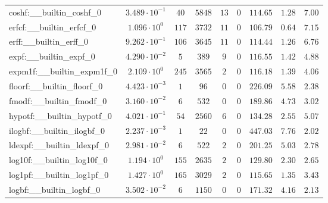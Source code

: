 \begin{tabular}{|l|c|c|c|c|c|c|c|c|}
coshf:\_\_builtin\_coshf\_0               & $ 3.489 \cdot 10^{-1} $ & $ 40     $ & $ 5848   $ & $ 13  $ & $ 0   $ & $ 114.65      $ & $ 1.28    $ & $ 7.00    $ \\
erfcf:\_\_builtin\_erfcf\_0               & $ 1.096 \cdot 10^{0}  $ & $ 117    $ & $ 3732   $ & $ 11  $ & $ 0   $ & $ 106.79      $ & $ 0.64    $ & $ 7.15    $ \\
erff:\_\_builtin\_erff\_0                 & $ 9.262 \cdot 10^{-1} $ & $ 106    $ & $ 3645   $ & $ 11  $ & $ 0   $ & $ 114.44      $ & $ 1.26    $ & $ 6.76    $ \\
expf:\_\_builtin\_expf\_0                 & $ 4.290 \cdot 10^{-2} $ & $ 5      $ & $ 389    $ & $ 9   $ & $ 0   $ & $ 116.55      $ & $ 1.42    $ & $ 4.88    $ \\
expm1f:\_\_builtin\_expm1f\_0             & $ 2.109 \cdot 10^{0}  $ & $ 245    $ & $ 3565   $ & $ 2   $ & $ 0   $ & $ 116.18      $ & $ 1.39    $ & $ 4.06    $ \\
floorf:\_\_builtin\_floorf\_0             & $ 4.423 \cdot 10^{-3} $ & $ 1      $ & $ 96     $ & $ 0   $ & $ 0   $ & $ 226.09      $ & $ 5.58    $ & $ 2.38    $ \\
fmodf:\_\_builtin\_fmodf\_0               & $ 3.160 \cdot 10^{-2} $ & $ 6      $ & $ 532    $ & $ 0   $ & $ 0   $ & $ 189.86      $ & $ 4.73    $ & $ 3.02    $ \\
hypotf:\_\_builtin\_hypotf\_0             & $ 4.021 \cdot 10^{-1} $ & $ 54     $ & $ 2560   $ & $ 6   $ & $ 0   $ & $ 134.28      $ & $ 2.55    $ & $ 5.07    $ \\
ilogbf:\_\_builtin\_ilogbf\_0             & $ 2.237 \cdot 10^{-3} $ & $ 1      $ & $ 22     $ & $ 0   $ & $ 0   $ & $ 447.03      $ & $ 7.76    $ & $ 2.02    $ \\
ldexpf:\_\_builtin\_ldexpf\_0             & $ 2.981 \cdot 10^{-2} $ & $ 6      $ & $ 522    $ & $ 2   $ & $ 0   $ & $ 201.25      $ & $ 5.03    $ & $ 2.78    $ \\
log10f:\_\_builtin\_log10f\_0             & $ 1.194 \cdot 10^{0}  $ & $ 155    $ & $ 2635   $ & $ 2   $ & $ 0   $ & $ 129.80      $ & $ 2.30    $ & $ 2.65    $ \\
log1pf:\_\_builtin\_log1pf\_0             & $ 1.427 \cdot 10^{0}  $ & $ 165    $ & $ 3029   $ & $ 2   $ & $ 0   $ & $ 115.65      $ & $ 1.35    $ & $ 3.43    $ \\
logbf:\_\_builtin\_logbf\_0               & $ 3.502 \cdot 10^{-2} $ & $ 6      $ & $ 1150   $ & $ 0   $ & $ 0   $ & $ 171.32      $ & $ 4.16    $ & $ 2.13    $ \\

\end{tabular}
